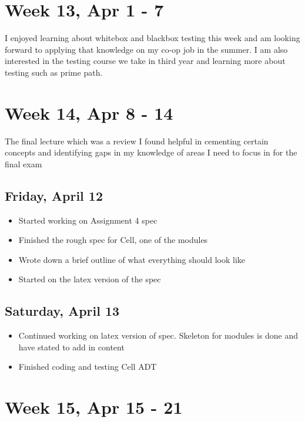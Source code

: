 \documentclass{article}
\begin{document}
\section{Week 13, Apr 1 - 7}

I enjoyed learning about whitebox and blackbox testing this week and am looking forward to applying that knowledge on my co-op job in the summer. I am also interested in the testing course we take in third year and learning more about testing such as prime path.

\section{Week 14, Apr 8 - 14}

The final lecture which was a review I found helpful in cementing certain concepts and identifying gaps in my knowledge of areas I need to focus in for the final exam

\subsection{Friday, April 12}
\begin{itemize}
    \item Started working on Assignment 4 spec
    \item Finished the rough spec for Cell, one of the modules
    \item Wrote down a brief outline of what everything should look like
    \item Started on the latex version of the spec
\end{itemize}

\subsection{Saturday, April 13}
\begin{itemize}
    \item Continued working on latex version of spec. Skeleton for modules is done and have stated to add in content
    \item Finished coding and testing Cell ADT
\end{itemize}

\section{Week 15, Apr 15 - 21}
\end{document}

